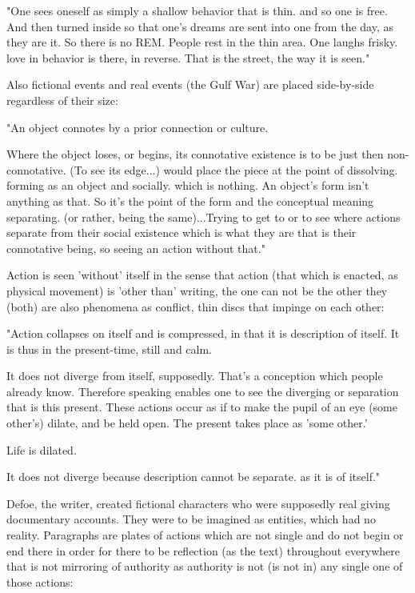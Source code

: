 "One sees oneself as simply a shallow behavior that is thin. and so one
is free. And then turned inside so that one's dreams are sent into one
from the day, as they are it. So there is no REM. People rest in the
thin area. One laughs frisky. love in behavior is there, in reverse.
That is the street, the way it is seen."

Also fictional events and real events (the Gulf War) are placed
side-by-side regardless of their size:

"An object connotes by a prior connection or culture.

Where the object loses, or begins, its connotative existence is to be
just then non-connotative. (To see its edge...) would place the piece at
the point of dissolving. forming as an object and socially. which is
nothing. An object's form isn't anything as that. So it's the point of
the form and the conceptual meaning separating. (or rather, being the
same)...Trying to get to or to see where actions separate from their
social existence which is what they are that is their connotative being,
so seeing an action without that."

Action is seen 'without' itself in the sense that action (that which is
enacted, as physical movement) is 'other than' writing, the one can not
be the other they (both) are also phenomena as conflict, thin discs that
impinge on each other:

"Action collapses on itself and is compressed, in that it is description
of itself. It is thus in the present-time, still and calm.

It does not diverge from itself, supposedly. That's a conception which
people already know. Therefore speaking enables one to see the diverging
or separation that is this present. These actions occur as if to make
the pupil of an eye (some other's) dilate, and be held open. The present
takes place as 'some other.'

Life is dilated.

It does not diverge because description cannot be separate. as it is of
itself."

Defoe, the writer, created fictional characters who were supposedly real
giving documentary accounts. They were to be imagined as entities, which
had no reality. Paragraphs are plates of actions which are not single
and do not begin or end there in order for there to be reflection (as
the text) throughout everywhere that is not mirroring of authority as
authority is not (is not in) any single one of those actions:

